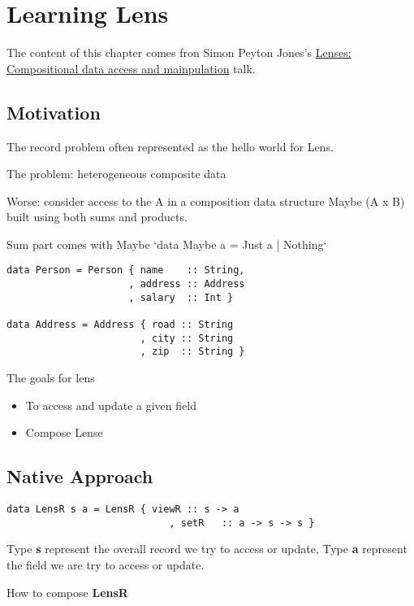 \chapter{Learning Lens}


The content of this chapter comes fron Simon Peyton Jones's \href{https://skillsmatter.com/skillscasts/4251-lenses-compositional-data-access-and-manipulation}{Lenses: Compositional data access and mainpulation} talk.

\section{Motivation}

The record problem often represented as the hello world for Lens.

The problem: heterogeneous composite data

Worse: consider access to the A in a composition data structure
Maybe (A x B) built using both sums and products.

Sum part comes with Maybe `data Maybe a = Just a | Nothing`

\begin{verbatim}
data Person = Person { name    :: String,
                     , address :: Address
                     , salary  :: Int }

data Address = Address { road :: String
                       , city :: String
                       , zip  :: String }
\end{verbatim}


The goals for lens
\begin{itemize}
\item To access and update a given field
\item Compose Lense
\end{itemize}

\section{Native Approach}


\begin{verbatim}
data LensR s a = LensR { viewR :: s -> a
                            , setR   :: a -> s -> s }
\end{verbatim}

Type \textbf{s} represent the overall record we try to access or update, Type \textbf{a} represent the field we are try to access or update.

How to compose \textbf{LensR}

